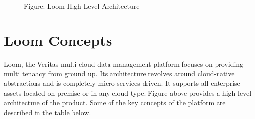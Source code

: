 \documentclass[letterpaper,10pt,english]{sphinxhowto}
\begin{document}
\begin{figure}[htbp]
\centering
\capstart

\noindent{}
\caption{Figure: Loom High Level Architecture}\label{\detokenize{col/ds/mcdmp_ds_opt2:id1}}\end{figure}


\section{Loom Concepts}
\label{\detokenize{col/ds/mcdmp_ds_opt2:loom-concepts}}
Loom, the Veritas multi-cloud data management platform focuses on providing multi tenancy from ground up. Its architecture revolves around cloud-native abstractions and is completely micro-services driven. It supports all enterprise assets located on premise or in any cloud type. Figure above provides a high-level architecture of the product. Some of the key concepts of the platform are described in the table below.
\end{document}
